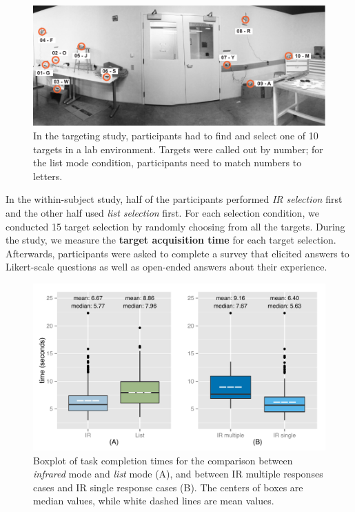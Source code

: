 \begin{figure}[t]
\centering
\includegraphics[width=1.0\columnwidth]{figures/targeting-study-layout.pdf}
\caption{In the targeting study, participants had to find and select one of 10 targets in a lab environment. Targets were called out by number; for the list mode condition, participants need to match numbers to letters.}
\label{fig:targeting-study-layout}
\end{figure}

In the within-subject study, half of the participants performed {\em IR selection} first and the other half used {\em list selection} first. For each selection condition, we conducted 15 target selection by randomly choosing from all the targets. During the study, we measure the {\bf target acquisition time} for each target selection. Afterwards, participants were asked to complete a survey that elicited answers to Likert-scale questions as well as open-ended answers about their experience.


\begin{figure}[t]
\centering
\includegraphics[width=1.0\columnwidth]{figures/R_time_by_Category.pdf}
\caption{Boxplot of task completion times for the comparison between {\em infrared} mode and {\em list} mode (A), and between IR multiple responses cases and IR single response cases (B). The centers of boxes are median values, while white dashed lines are mean values.}
\label{fig:selection-time}
\end{figure}

